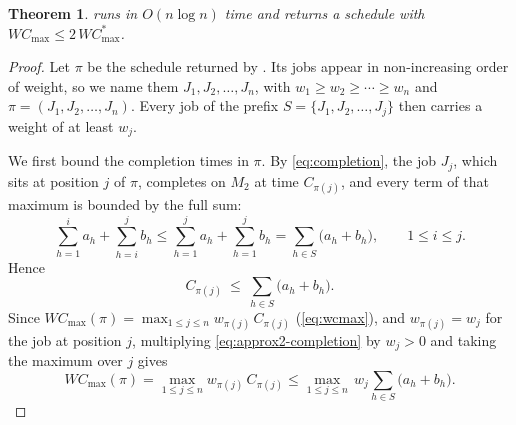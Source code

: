 \documentclass[12pt]{article}
\newtheorem{theorem}{Theorem}[section]
\begin{document}
\begin{sloppypar}
        \begin{theorem}\label{thm:approx2}
             runs in $O(n\log n)$ time and returns a schedule with
            $W C_{\max}\le 2\,W C_{\max}^{*}$.
        \end{theorem}
        
        \begin{proof}
            Let $\pi$ be the schedule returned by . Its jobs appear in non-increasing
            order of weight, so we name them $J_1,J_2,\dots,J_n$, with $w_1\ge w_2\ge\cdots\ge w_n$ and
            $\pi=(J_1,J_2,\dots,J_n)$. Every job of the prefix $S=\{J_1,J_2,\dots,J_j\}$ then carries
            a weight of at least $w_j$.
            
            We first bound the completion times in $\pi$. By \cref{eq:completion}, the job $J_j$, which
            sits at position $j$ of $\pi$, completes on $M_2$ at time $C_{\pi(j)}$, and every term of that
            maximum is bounded by the
            full sum:
            \[
            \sum_{h=1}^{i}a_h+\sum_{h=i}^{j}b_h
            \le \sum_{h=1}^{j}a_h+\sum_{h=1}^{j}b_h
            = \sum_{h\in S}\bigl(a_h+b_h\bigr),
            \qquad 1\le i\le j.
            \]
            Hence
            \begin{equation}\label{eq:approx2-completion}
                C_{\pi(j)}\ \le\ \sum_{h\in S}\bigl(a_h+b_h\bigr).
            \end{equation}
            Since $W C_{\max}(\pi)=\max_{1\le j\le n}w_{\pi(j)}\,C_{\pi(j)}$ (\cref{eq:wcmax}), and
            $w_{\pi(j)}=w_j$ for the job at position $j$, multiplying \cref{eq:approx2-completion}
            by $w_j>0$ and taking the maximum over $j$ gives
            \begin{equation}\label{eq:approx2-upper}
                W C_{\max}(\pi)=\max_{1\le j\le n}w_{\pi(j)}\,C_{\pi(j)}
                \le \max_{1\le j\le n}\,w_j\sum_{h\in S}\bigl(a_h+b_h\bigr).
            \end{equation}
            

\end{proof}
\end{sloppypar}
\end{document}
